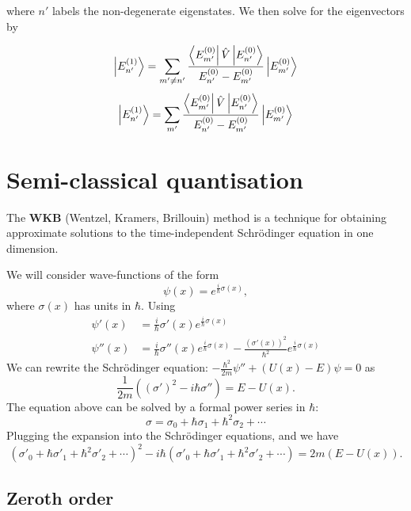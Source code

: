 \documentclass[12pt, a4paper]{article}
\begin{document}
where \(n'\) labels the non-degenerate eigenstates. We then solve for the eigenvectors by
\begin{mdprop}
    \[ \ket{E_{n'}^{(1)}} = \sum_{m' \neq n'} \frac{\bra{E_{m'}^{(0)}}\hat{V}\ket{E_{n'}^{(0)}}}{E_{n'}^{(0)} - E_{m'}^{(0)}} \ket{E_{m'}^{(0)}} \]
\[ \ket{E_{n'}^{(1)}} = \sum_{m'} \frac{\bra{E_{m'}^{(0)}}\hat{V}\ket{E_{n'}^{(0)}}}{E_{n'}^{(0)} - E_{m'}^{(0)}} \ket{E_{m'}^{(0)}} \]
\end{mdprop}


\section{Semi-classical quantisation}

\begin{definition}
    The \textbf{WKB} (Wentzel, Kramers, Brillouin) method is a technique for obtaining approximate solutions to the time-independent Schrödinger equation in one dimension.
\end{definition}

\noindent We will consider wave-functions of the form
\[\psi(x) = e^{\frac{i}{\hbar} \sigma(x)},\]
where \(\sigma(x)\) has units in \(\hbar\). Using
\[\begin{aligned}
    \psi'(x) &=\frac{i}{\hbar} \sigma'(x) e^{\frac{i}{\hbar} \sigma(x)}\\
    \psi''(x) &= \frac{i}{\hbar} \sigma''(x) e^{\frac{i}{\hbar} \sigma(x)}-\frac{(\sigma'(x))^2}{\hbar^2}e^{\frac{i}{\hbar} \sigma(x)}
\end{aligned}\]
We can rewrite the Schrödinger equation: \(-\frac{\hbar^2}{2m}\psi''+(U(x)-E)\psi=0\) as 
\[\frac{1}{2m} \left( (\sigma')^2-i\hbar \sigma'' \right)=E-U(x).\]
The equation above can be solved by a formal power series in \(\hbar\):
\[\sigma = \sigma_0 + \hbar\sigma_1+ \hbar^2 \sigma_2 +\cdots\]
Plugging the expansion into the Schrödinger equations, and we have 
\[(\sigma'_0 + \hbar\sigma'_1+ \hbar^2 \sigma'_2 +\cdots)^2-i\hbar\left( \sigma'_0 + \hbar\sigma'_1+ \hbar^2 \sigma'_2 +\cdots \right)=2m(E-U(x)).\]

\subsection{Zeroth order}
\end{document}
